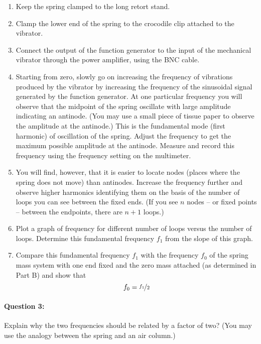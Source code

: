 \begin{enumerate}
\item Keep the spring clamped to the long retort stand.

\item Clamp the lower end of the spring to the crocodile clip attached to the vibrator.

\item Connect the output of the function generator to the input of the mechanical vibrator
through the power amplifier, using the BNC cable.

\item Starting from zero, slowly go on increasing the frequency of vibrations produced by the vibrator by increasing the frequency of the sinusoidal signal generated by the function generator. At one particular frequency you will observe that the midpoint of the spring oscillate with large amplitude indicating an antinode. (You may use a small piece of tissue paper to observe the amplitude at the antinode.) This is the fundamental mode (first harmonic) of oscillation of the spring. Adjust the frequency to get the maximum possible amplitude at the antinode. Measure and record this frequency using the frequency setting on the multimeter.

\item You will find, however, that it is easier to locate nodes (places where the spring does not move) than antinodes. Increase the frequency further and observe higher harmonics identifying them on the basis of the number of loops you can see between the fixed ends. (If you see $n$ nodes -- or fixed points -- between the endpoints, there are $n+1$ loops.)

\item Plot a graph of frequency for different number of loops versus the number of loops. Determine this fundamental frequency $f_1$ from the slope of this graph.

\item Compare this fundamental frequency $f_1$ with the frequency $f_0$ of the spring mass
system with one end fixed and the zero mass attached (as determined in Part B) and
show that $$f_0 = \nicefrac{f_1}{2}$$
\end{enumerate}

\paragraph{Question 3:} Explain why the two frequencies should be related by a factor of two? (You may use the analogy between the spring and an air column.)


